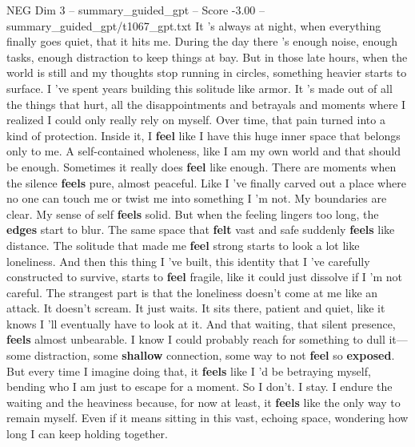 \begin{textsample}{NEG Dim 3 – summary\_guided\_gpt – Score -3.00 – summary\_guided\_gpt/t1067\_gpt.txt}  \label{ex:f3_neg_030}
It ’s always at night, when everything finally goes quiet, that it hits me.
During the day there ’s enough noise, enough tasks, enough distraction to keep things at bay.
But in those late hours, when the world is still and my thoughts stop running in circles, something heavier starts to surface.
I ’ve spent years building this solitude like armor.
It ’s made out of all the things that hurt, all the disappointments and betrayals and moments where I realized I could only really rely on myself.
Over time, that pain turned into a kind of protection.
Inside it, I \textbf{feel} like I have this huge inner space that belongs only to me.
A self-contained wholeness, like I am my own world and that should be enough.
Sometimes it really does \textbf{feel} like enough.
There are moments when the silence \textbf{feels} pure, almost peaceful.
Like I ’ve finally carved out a place where no one can touch me or twist me into something I ’m not.
My boundaries are clear.
My sense of self \textbf{feels} solid.
But when the feeling lingers too long, the \textbf{edges} start to blur.
The same space that \textbf{felt} vast and safe suddenly \textbf{feels} like distance.
The solitude that made me \textbf{feel} strong starts to look a lot like loneliness.
And then this thing I ’ve built, this identity that I ’ve carefully constructed to survive, starts to \textbf{feel} fragile, like it could just dissolve if I ’m not careful.
The strangest part is that the loneliness doesn't come at me like an attack.
It doesn't scream.
It just waits.
It sits there, patient and quiet, like it knows I ’ll eventually have to look at it.
And that waiting, that silent presence, \textbf{feels} almost unbearable.
I know I could probably reach for something to dull it—some distraction, some \textbf{shallow} connection, some way to not \textbf{feel} so \textbf{exposed}.
But every time I imagine doing that, it \textbf{feels} like I ’d be betraying myself, bending who I am just to escape for a moment.
So I don't.
I stay.
I endure the waiting and the heaviness because, for now at least, it \textbf{feels} like the only way to remain myself.
Even if it means sitting in this vast, echoing space, wondering how long I can keep holding together.

\end{textsample}
